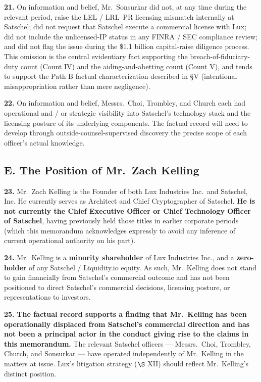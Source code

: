 \documentclass[11pt,letterpaper]{article}
\begin{document}
\textbf{21.} On information and belief, Mr.\ Sonsurkar did not, at any
time during the relevant period, raise the LEL / LRL--PR licensing
mismatch internally at Satschel; did not request that Satschel
execute a commercial license with Lux; did not include the
unlicensed-IP status in any FINRA / SEC compliance review; and did
not flag the issue during the \$1.1 billion capital-raise diligence
process. This omission is the central evidentiary fact supporting the
breach-of-fiduciary-duty count (Count IV) and the aiding-and-abetting
count (Count V), and tends to support the Path B factual
characterization described in \S V (intentional misappropriation
rather than mere negligence).

\textbf{22.} On information and belief, Messrs.\ Choi, Trombley, and
Church each had operational and / or strategic visibility into
Satschel's technology stack and the licensing posture of its
underlying components. The factual record will need to develop
through outside-counsel-supervised discovery the precise scope of
each officer's actual knowledge.

\subsection*{E. The Position of Mr.\ Zach Kelling}

\textbf{23.} Mr.\ Zach Kelling is the Founder of both Lux Industries
Inc.\ and Satschel, Inc. He currently serves as Architect and Chief
Cryptographer of Satschel. \textbf{He is not currently the Chief
Executive Officer or Chief Technology Officer of Satschel}, having
previously held those titles in earlier corporate periods (which
this memorandum acknowledges expressly to avoid any inference of
current operational authority on his part).

\textbf{24.} Mr.\ Kelling is a \textbf{minority shareholder} of Lux
Industries Inc., and a \textbf{zero-holder} of any Satschel /
Liquidity.io equity. As such, Mr.\ Kelling does not stand to gain
financially from Satschel's commercial outcome and has not been
positioned to direct Satschel's commercial decisions, licensing
posture, or representations to investors.

\textbf{25.} \textbf{The factual record supports a finding that Mr.\
Kelling has been operationally displaced from Satschel's commercial
direction and has not been a principal actor in the conduct giving
rise to the claims in this memorandum.} The relevant Satschel
officers --- Messrs.\ Choi, Trombley, Church, and Sonsurkar --- have
operated independently of Mr.\ Kelling in the matters at issue. Lux's
litigation strategy ($\S$ XII) should reflect Mr.\ Kelling's distinct
position.
\end{document}
